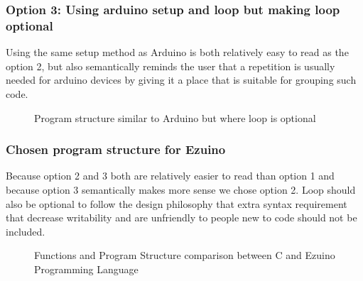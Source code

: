 \subsubsection{Option 3: Using arduino setup and loop but making loop optional}
Using the same setup method as Arduino is both relatively easy to read as the option 2, but also semantically reminds the user that a repetition is usually needed for arduino devices by giving it a place that is suitable for grouping such code.
\begin{figure}[H]
\centering
{}
\caption{Program structure similar to Arduino but where loop is optional}
\label{lf10}
\end{figure}

\subsubsection{Chosen program structure for Ezuino}
Because option 2 and 3 both are relatively easier to read than option 1 and because option 3 semantically makes more sense we chose option 2. Loop should also be optional to follow the design philosophy that extra syntax requirement that decrease writability and are unfriendly to people new to code should not be included. 
\begin{figure}[H]
\centering
{}
\caption{Functions and Program Structure comparison between C and Ezuino Programming Language}
\label{lf10}
\end{figure}
